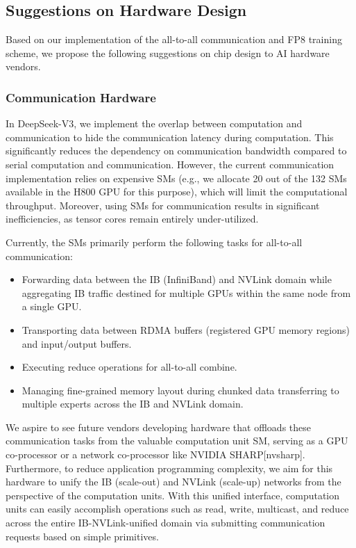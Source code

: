 \documentclass[11pt,a4paper]{article}
\begin{document}
\subsection{Suggestions on Hardware Design}

Based on our implementation of the all-to-all communication and FP8 training scheme, we propose the following suggestions on chip design to AI hardware vendors.

\subsubsection{Communication Hardware}

In DeepSeek-V3, we implement the overlap between computation and communication to hide the communication latency during computation. This significantly reduces the dependency on communication bandwidth compared to serial computation and communication. However, the current communication implementation relies on expensive SMs (e.g., we allocate 20 out of the 132 SMs available in the H800 GPU for this purpose), which will limit the computational throughput. Moreover, using SMs for communication results in significant inefficiencies, as tensor cores remain entirely under-utilized.

Currently, the SMs primarily perform the following tasks for all-to-all communication:

\begin{itemize}
\item Forwarding data between the IB (InfiniBand) and NVLink domain while aggregating IB traffic destined for multiple GPUs within the same node from a single GPU.
\item Transporting data between RDMA buffers (registered GPU memory regions) and input/output buffers.
\item Executing reduce operations for all-to-all combine.
\item Managing fine-grained memory layout during chunked data transferring to multiple experts across the IB and NVLink domain.
\end{itemize}

We aspire to see future vendors developing hardware that offloads these communication tasks from the valuable computation unit SM, serving as a GPU co-processor or a network co-processor like NVIDIA SHARP[nvsharp]. Furthermore, to reduce application programming complexity, we aim for this hardware to unify the IB (scale-out) and NVLink (scale-up) networks from the perspective of the computation units. With this unified interface, computation units can easily accomplish operations such as read, write, multicast, and reduce across the entire IB-NVLink-unified domain via submitting communication requests based on simple primitives.
\end{document}
